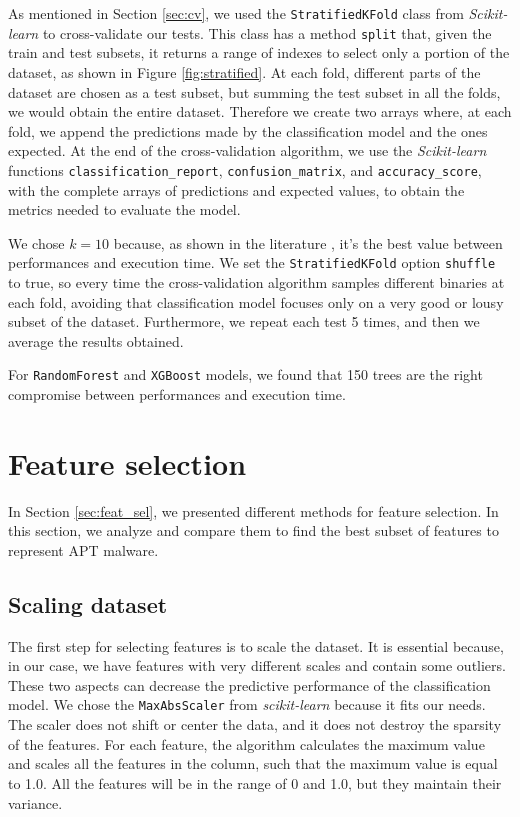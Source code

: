 As mentioned in Section \ref{sec:cv}, we used the \texttt{StratifiedKFold} class from \textit{Scikit-learn} to cross-validate our tests. This class has a method \texttt{split} that, given the train and test subsets, it returns a range of indexes to select only a portion of the dataset, as shown in Figure \ref{fig:stratified}.  At each fold, different parts of the dataset are chosen as a test subset, but summing the test subset in all the folds, we would obtain the entire dataset. Therefore we create two arrays where, at each fold, we append the predictions made by the classification model and the ones expected. At the end of the cross-validation algorithm, we use the \textit{Scikit-learn} functions \texttt{classification\_report}, \texttt{confusion\_matrix}, and \texttt{accuracy\_score}, with the complete arrays of predictions and expected values, to obtain the metrics needed to evaluate the model.

We chose $k = 10$ because, as shown in the literature \cite{kohavi1995study}, it's the best value between performances and execution time. 
We set the \texttt{StratifiedKFold} option \texttt{shuffle} to true, so every time the cross-validation algorithm samples different binaries at each fold, avoiding that classification model focuses only on a very good or lousy subset of the dataset. Furthermore, we repeat each test 5 times, and then we average the results obtained.

For \texttt{RandomForest} and \texttt{XGBoost} models, we found that 150 trees are the right compromise between performances and execution time.

\section{Feature selection}
In Section \ref{sec:feat_sel}, we presented different methods for feature selection. In this section, we analyze and compare them to find the best subset of features to represent APT malware.

\subsection{Scaling dataset}
The first step for selecting features is to scale the dataset. It is essential because, in our case, we have features with very different scales and contain some outliers. These two aspects can decrease the predictive performance of the classification model. We chose the \texttt{MaxAbsScaler} from \textit{scikit-learn} because it fits our needs. The scaler does not shift or center the data, and it does not destroy the sparsity of the features. For each feature, the algorithm calculates the maximum value and scales all the features in the column, such that the maximum value is equal to 1.0. All the features will be in the range of 0 and 1.0, but they maintain their variance.

